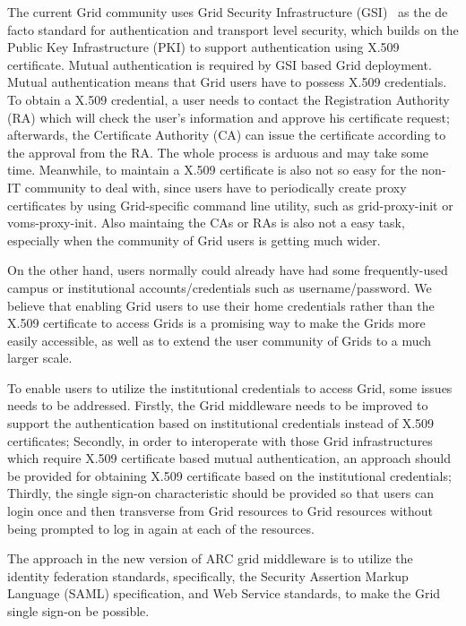 \documentclass[conference]{IEEEtran}
\begin{document}
The current Grid community uses Grid Security Infrastructure (GSI)~\cite{IFoster98} as the de facto 
standard for authentication and transport level security, which builds on the Public Key Infrastructure
(PKI) to support authentication using X.509 certificate. Mutual authentication is required 
by GSI based Grid deployment. Mutual authentication means that Grid users have to possess X.509 
credentials. To obtain a X.509 credential, a user needs to contact the Registration Authority (RA)
which will check the user's information and approve his certificate request; afterwards,
the Certificate Authority (CA) can issue the certificate according to the approval from 
the RA. The whole process is arduous and may take some time.
Meanwhile, to maintain a X.509 certificate is also not so easy for the non-IT community to deal 
with, since users have to periodically create proxy certificates by using Grid-specific command line 
utility, such as grid-proxy-init or voms-proxy-init. Also maintaing the CAs or RAs is also not a  
easy task, especially when the community of Grid users is getting much wider.

On the other hand, users normally could already have had some frequently-used campus or institutional 
accounts/credentials such as username/password. We believe that enabling Grid users to use their home 
credentials rather than the X.509 certificate to access Grids is a promising way 
to make the Grids more easily accessible, as well as to extend the user community of Grids
to a much larger scale.

To enable users to utilize the institutional credentials to access Grid, some issues needs to be 
addressed. Firstly, the Grid middleware needs to be improved to support the authentication based on
institutional credentials instead of X.509 certificates; Secondly, in order to interoperate with
those Grid infrastructures which require X.509 certificate based mutual authentication, an approach
should be provided for obtaining X.509 certificate based on the institutional credentials; Thirdly,
the single sign-on characteristic should be provided so that users can login once and then transverse 
from Grid resources to Grid resources without being prompted to log in again at each of the resources.

The approach in the new version of ARC grid middleware is to utilize the identity federation 
standards, specifically, the Security Assertion Markup Language (SAML) specification, and Web 
Service standards, to make the Grid single sign-on be possible.
\end{document}

